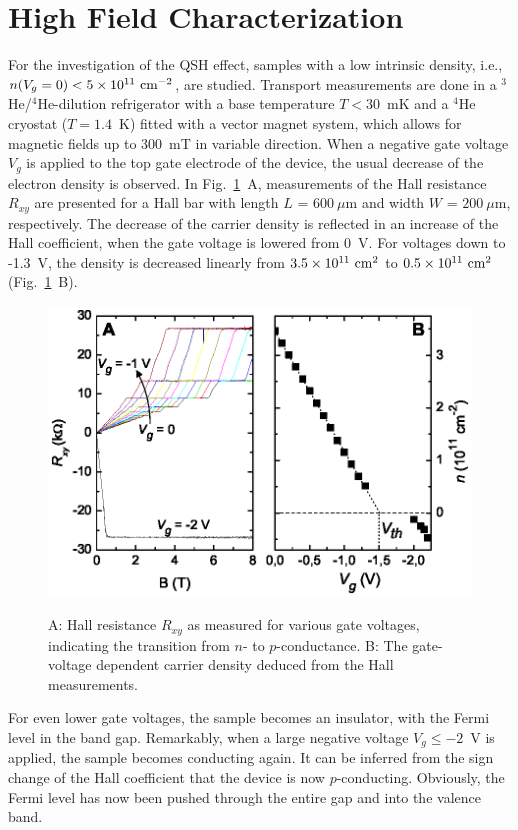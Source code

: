 \documentclass{article}
\begin{document}
\section{High Field Characterization}

For the investigation of the QSH effect, samples with a low
intrinsic density, i.e., $n(V_g=0)<5\times10^{11}~{\rm cm}^{-2}$,
are studied. Transport measurements are done in a
$^3$He/$^4$He-dilution refrigerator with a base temperature
$T<30$~mK and a $^4$He cryostat ($T=1.4$~K) fitted with a vector
magnet system, which allows for magnetic fields up to 300~mT in
variable direction. When a negative gate voltage $V_g$ is applied to
the top gate electrode of the device, the usual decrease of the
electron density is observed. In Fig.~\ref{Fignipdens}~A,
measurements of the Hall resistance $R_{xy}$ are presented for a
Hall bar with length $L$ = $600~\mu$m and width $W$ = $200~\mu$m,
respectively. The decrease of the carrier density is reflected in an
increase of the Hall coefficient, when the gate voltage is lowered
from 0~V. For voltages down to -1.3~V, the density is decreased
linearly from $3.5\times10^{11}~{\rm cm}^{2}$ to
$0.5\times10^{11}~{\rm cm}^{2}$ (Fig.~\ref{Fignipdens}~B).
\begin{figure}[htb]
\centering
 \includegraphics[width=0.8\linewidth]{80608Fig08.eps}\\
 \caption{A: Hall resistance $R_{xy}$ as measured for various gate
voltages, indicating the transition from $n$- to $p$-conductance. B:
The gate-voltage dependent carrier density deduced from the Hall
measurements.}\label{Fignipdens}
\end{figure}
For even lower gate voltages, the sample becomes an insulator, with
the Fermi level in the band gap. Remarkably, when a large negative
voltage $V_g\leq-2$~V is applied, the sample becomes conducting
again. It can be inferred from the sign change of the Hall
coefficient that the device is now $p$-conducting. Obviously, the
Fermi level has now been pushed through the entire gap and into the
valence band.
\end{document}
